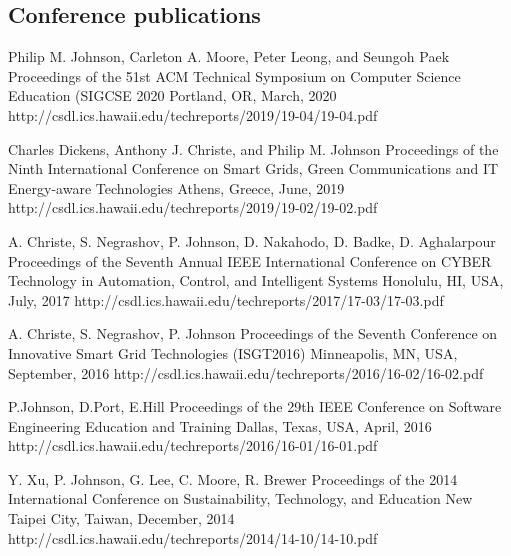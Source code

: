 \documentclass[11pt,letterpaper,sans]{moderncv} %
\begin{document}
\subsection{Conference publications}

          {Philip M. Johnson, Carleton A. Moore, Peter Leong, and Seungoh Paek}
          {Proceedings of the 51st ACM Technical Symposium on Computer Science Education (SIGCSE 2020}
          {Portland, OR, March, 2020}
          {http://csdl.ics.hawaii.edu/techreports/2019/19-04/19-04.pdf}


          {Charles Dickens, Anthony J. Christe, and Philip M. Johnson}
          {Proceedings of the Ninth International Conference on Smart Grids, Green Communications and IT Energy-aware Technologies}
          {Athens, Greece, June, 2019}
          {http://csdl.ics.hawaii.edu/techreports/2019/19-02/19-02.pdf}

          {A. Christe, S. Negrashov, P. Johnson, D. Nakahodo, D. Badke, D. Aghalarpour}
          {Proceedings of the Seventh Annual IEEE International Conference on CYBER Technology in Automation, Control, and Intelligent Systems}
          {Honolulu, HI, USA, July, 2017}
          {http://csdl.ics.hawaii.edu/techreports/2017/17-03/17-03.pdf}

          {A. Christe, S. Negrashov, P. Johnson}
          {Proceedings of the Seventh Conference on Innovative Smart Grid Technologies (ISGT2016)}
          {Minneapolis, MN, USA, September, 2016}
          {http://csdl.ics.hawaii.edu/techreports/2016/16-02/16-02.pdf}

          {P.Johnson, D.Port, E.Hill}
          {Proceedings of the 29th IEEE Conference on Software Engineering Education and Training}
          {Dallas, Texas, USA, April, 2016}
          {http://csdl.ics.hawaii.edu/techreports/2016/16-01/16-01.pdf}


          {Y. Xu, P. Johnson, G. Lee, C. Moore, R. Brewer}
          {Proceedings of the 2014 International Conference on Sustainability, Technology, and Education}
          {New Taipei City, Taiwan, December, 2014}
          {http://csdl.ics.hawaii.edu/techreports/2014/14-10/14-10.pdf}
\end{document}
